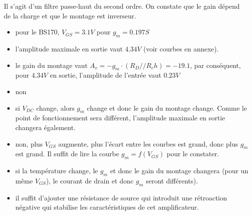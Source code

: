 \documentclass{../template/tp}
\begin{document}
{\begin{itemize}
		Il s'agit d'un filtre passe-haut du second ordre.
		On constate que le gain dépend de la charge et que le montage est inverseur.
\end{itemize}
	


}

{
\begin{itemize}
\item pour le BS170, $V_{GS}=3.1V$ pour $g_m=0.197S$
\item l'amplitude maximale en sortie vaut $4.34V$ (voir courbes en annexe).
\item le gain du montage vaut $A_v=-g_m\cdot \left(R_D//R_ch\right)=-19.1$, par conséquent, pour $4.34V$ en sortie, l'amplitude de l'entrée vaut $0.23V$
\item non
\item si $V_{DC}$ change, alors $g_m$ change et donc le gain du montage change. Comme le point de fonctionnement sera différent, l'amplitude maximale en sortie changera également.
\item non, plus $V_{GS}$ augmente, plus l'écart entre les courbes est grand, donc plus $g_m$ est grand. Il suffit de lire la courbe $g_m=f(V_{GS})$ pour le constater.
\item si la température change, le $g_m$ et donc le gain du montage changera (pour un même $V_{GS}$), le courant de drain et donc $g_m$ seront différents).
\item il suffit d'ajouter une résistance de source qui introduit une rétroaction négative qui stabilise les caractéristiques de cet amplificateur. 
\end{itemize}
}
\end{document}
